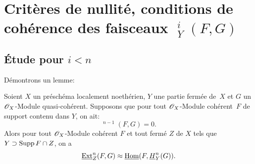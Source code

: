\chapter[Crit\`eres de nullit\'e, conditions de coh\'erence]
{Crit\`eres de nullit\'e, conditions de coh\'erence des faisceaux $\mathop{\underline{\mathrm{Ext}}}\nolimits^{i}_{Y}(F, G)$}\label{VII}

\renewcommand{\theequation}{\thesection.\arabic{equation}}

\section{\'Etude pour $i < n$}

D\'emontrons un lemme:

\begin{lemme} \label{VII.1.1}
Soient $X$ un pr\'esch\'ema localement noeth\'erien, $Y$ une partie ferm\'ee de~$X$ et $G$ un $\mathscr{O}_X$-Module quasi-coh\'erent. Supposons que pour tout $\mathscr{O}_X$-Module coh\'erent~$F$ de support contenu dans $Y$, on ait:
\[
\mathop{\underline{\mathrm{Ext}}}\nolimits^{n-1}(F, G) = 0.
\]
Alors pour tout $\mathscr{O}_X$-Module coh\'erent $F$ et tout ferm\'e $Z$ de $X$ tels que $Y \supset \operatorname{Supp} F \cap Z$, on a
\[
\mathop{\underline{\mathrm{Ext}}}\nolimits^n_Z(F, G) \approx \mathop{\underline{\mathrm{Hom}}}\nolimits (F, \underline{H}^n_Y(G)).
\]
\end{lemme}

